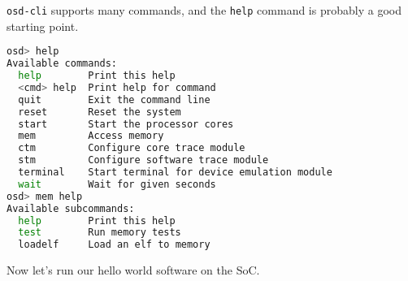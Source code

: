 \verb|osd-cli| supports many commands, and the \verb|help| command is probably a good starting point.

\begin{lstlisting}[language=sh]
osd> help
Available commands:
  help        Print this help
  <cmd> help  Print help for command
  quit        Exit the command line
  reset       Reset the system
  start       Start the processor cores
  mem         Access memory
  ctm         Configure core trace module
  stm         Configure software trace module
  terminal    Start terminal for device emulation module
  wait        Wait for given seconds
osd> mem help
Available subcommands:
  help        Print this help
  test        Run memory tests
  loadelf     Load an elf to memory
\end{lstlisting}

Now let's run our hello world software on the SoC.

